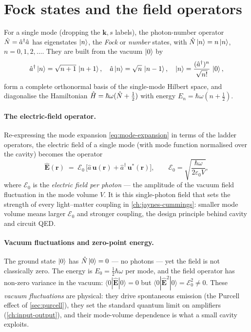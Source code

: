 \section{Fock states and the field operators}
\label{sec:fock-states}

\begin{statement}
\label{stmt:fock}
For a single mode (dropping the $\bm k,s$ labels), the
photon-number operator $\hat{N}=\hat a^\dagger\hat a$ has eigenstates
$\ket n$, the \emph{Fock} or \emph{number} states, with
$\hat{N}\ket n=n\ket n$, $n=0,1,2,\dots$. They are built from the
vacuum $\ket0$ by
\begin{equation}
\label{eq:fock-ladder}
\hat a^\dagger\ket n=\sqrt{n+1}\,\ket{n+1},\quad
\hat a\ket n=\sqrt n\,\ket{n-1},\quad
\ket n=\frac{(\hat a^\dagger)^n}{\sqrt{n!}}\,\ket0,
\end{equation}
form a complete orthonormal basis of the single-mode Hilbert space,
and diagonalise the Hamiltonian
$\hat{H}=\hbar\omega(\hat{N}+\tfrac12)$ with energy
$E_n=\hbar\omega(n+\tfrac12)$.
\end{statement}

\paragraph{The electric-field operator.}
Re-expressing the mode expansion \cref{eq:mode-expansion} in terms
of the ladder operators, the electric field of a single mode (with
mode function normalised over the cavity) becomes the operator
\begin{equation}
\label{eq:efield-operator}
\hat{\bm E}(\bm r) \;=\; \bm{\mathcal E}_0\,\bigl[\hat a\,\bm u(\bm r) + \hat a^\dagger\,\bm u^*(\bm r)\bigr],
\qquad
\mathcal E_0=\sqrt{\frac{\hbar\omega}{2\varepsilon_0 V}},
\end{equation}
where $\mathcal E_0$ is the \emph{electric field per photon} --- the
amplitude of the vacuum field fluctuation in the mode volume $V$. It
is this single-photon field that sets the strength of every
light--matter coupling in \cref{ch:jaynes-cummings}: smaller mode
volume means larger $\mathcal E_0$ and stronger coupling, the design
principle behind cavity and circuit QED.

\paragraph{Vacuum fluctuations and zero-point energy.}
The ground state $\ket0$ has $\hat{N}\ket0=0$ --- no photons --- yet
the field is not classically zero. The energy is
$E_0=\tfrac12\hbar\omega$ per mode, and the field operator has
non-zero variance in the vacuum: $\langle0|\hat{\bm E}|0\rangle=0$
but $\langle0|\hat{\bm E}^2|0\rangle=\mathcal E_0^2\neq0$. These
\emph{vacuum fluctuations} are physical: they drive spontaneous
emission (the Purcell effect of \cref{sec:purcell}), they set the
standard quantum limit on amplifiers (\cref{ch:input-output}), and
their mode-volume dependence is what a small cavity exploits.

